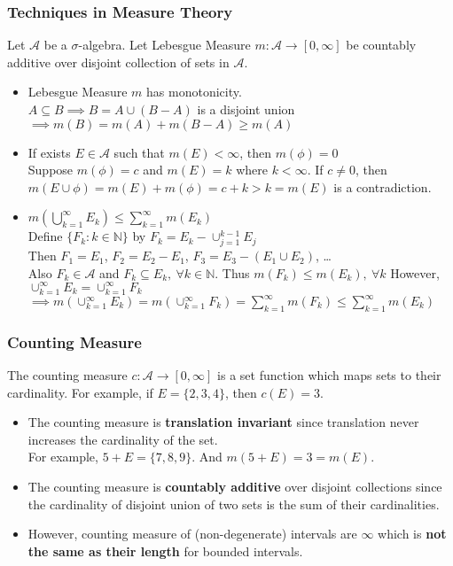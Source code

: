 \subsubsection{Techniques in Measure Theory}
	Let $\mathcal{A}$ be a $\sigma$-algebra.
	Let Lebesgue Measure $m : \mathcal{A} \to [0,\infty]$ be countably additive over disjoint collection of sets in $\mathcal{A}$.
\begin{itemize}
	\item Lebesgue Measure $m$ has monotonicity.\\
		$A \subseteq B \implies B = A \cup (B-A)$ is a disjoint union \\
		$\implies m(B) = m(A) + m(B-A) \ge m(A)$
	\item If exists $E \in \mathcal{A}$ such that $m(E) < \infty$, then $m(\phi) = 0$\\
		Suppose $m(\phi) = c$ and $m(E) = k$ where $k < \infty$.
		If $c \ne 0$, then $m(E \cup \phi) = m(E) + m(\phi) = c+k > k = m(E)$ is a contradiction.
	\item $\displaystyle m\left(\bigcup_{k=1}^\infty E_k\right) \le \sum_{k=1}^\infty m(E_k)$\\
		Define $\{ F_k : k \in \mathbb{N} \}$ by $F_k = E_k - \cup_{j = 1}^{k-1} E_j$\\
		Then $F_1 = E_1$, $F_2 = E_2 - E_1$, $F_3 = E_3 - (E_1 \cup E_2)$, \dots\\
		Also $F_k \in \mathcal{A}$ and $F_k \subseteq E_k,\ \forall k \in \mathbb{N}$.
		Thus $m(F_k) \le m(E_k),\ \forall k$
		However, $\cup_{k=1}^\infty E_k = \cup_{k=1}^\infty F_k$\\
		$\displaystyle \implies m\left( \cup_{k=1}^\infty E_k \right) = m \left( \cup_{k=1}^\infty F_k \right) = \sum_{k=1}^\infty m(F_k) \le \sum_{k=1}^\infty m(E_k)$
\end{itemize}

\subsubsection{Counting Measure}
	The counting measure $c : \mathcal{A} \to [0,\infty]$ is a set function which maps sets to their cardinality.
	For example, if $E = \{2,3,4\}$, then $c(E) = 3$.
\begin{itemize}
	\item The counting measure is \textbf{translation invariant} since translation never increases the cardinality of the set.\\
	For example, $5+E = \{7,8,9\}$.
	And $m(5+E) = 3 = m(E)$.
	\item The counting measure is \textbf{countably additive} over disjoint collections since the cardinality of disjoint union of two sets is the sum of their cardinalities.
	\item However, counting measure of (non-degenerate) intervals are $\infty$ which is \textbf{not the same as their length} for bounded intervals.
\end{itemize}

